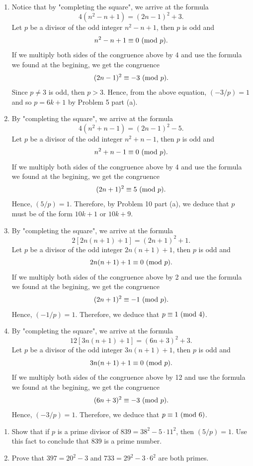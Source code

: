 \begin{solution}
    \begin{enumerate}
        \item Notice that by "completing the square", we arrive at the formula
        $$4(n^2 - n + 1) = (2n - 1)^2 + 3.$$
        Let $p$ be a divisor of the odd integer $n^2 - n + 1$, then $p$ is odd and 
        $$n^2 - n + 1 \equiv 0 \ (\mathrm{mod}\ p).$$
        If we multiply both sides of the congruence above by 4 and use the formula we found at the begining, we get the congruence
        $$(2n-1)^2 \equiv -3 \ (\mathrm{mod}\ p).$$
        Since $p \neq 3$ is odd, then $p > 3$. Hence, from the above equation, $(-3/p) = 1$ and so $p = 6k+1$ by Problem 5 part (a).
        \item By "completing the square", we arrive at the formula
        $$4(n^2 + n - 1) = (2n - 1)^2 -5.$$
        Let $p$ be a divisor of the odd integer $n^2 + n - 1$, then $p$ is odd and 
        $$n^2 + n - 1 \equiv 0 \ (\mathrm{mod}\ p).$$
        If we multiply both sides of the congruence above by 4 and use the formula we found at the begining, we get the congruence
        $$(2n+1)^2 \equiv 5 \ (\mathrm{mod}\ p).$$
        Hence, $(5/p) = 1$. Therefore, by Problem 10 part (a), we deduce that $p$ must be of the form $10k+1$ or $10k+9$.
        \item By "completing the square", we arrive at the formula
        $$2[2n(n+1) + 1] =(2n + 1)^2 + 1.$$
        Let $p$ be a divisor of the odd integer $2n(n+1) + 1$, then $p$ is odd and 
        $$2n(n+1) + 1 \equiv 0 \ (\mathrm{mod}\ p).$$
        If we multiply both sides of the congruence above by 2 and use the formula we found at the begining, we get the congruence
        $$(2n+1)^2 \equiv -1 \ (\mathrm{mod}\ p).$$
        Hence, $(-1/p) = 1$. Therefore, we deduce that $p \equiv 1 \ (\mathrm{mod}\ 4)$.
        \item By "completing the square", we arrive at the formula
        $$12[3n(n+1) + 1] = (6n + 3)^2 + 3.$$
        Let $p$ be a divisor of the odd integer $3n(n+1) + 1$, then $p$ is odd and 
        $$3n(n+1) + 1 \equiv 0 \ (\mathrm{mod}\ p).$$
        If we multiply both sides of the congruence above by 12 and use the formula we found at the begining, we get the congruence
        $$(6n+3)^2 \equiv -3 \ (\mathrm{mod}\ p).$$
        Hence, $(-3/p) = 1$. Therefore, we deduce that $p \equiv 1 \ (\mathrm{mod}\ 6)$. \\
    \end{enumerate}
\end{solution}

\begin{exercise}
    \begin{enumerate}
        \item Show that if $p$ is a prime divisor of $839 = 38^2  - 5\cdot 11^2$, then $(5/p) = 1$. Use this fact to conclude that 839 is a prime number. 
        \item Prove that $397 = 20^2 - 3$ and $733 = 29^2 - 3 \cdot 6^2$ are both primes.\\
    \end{enumerate}
\end{exercise}

